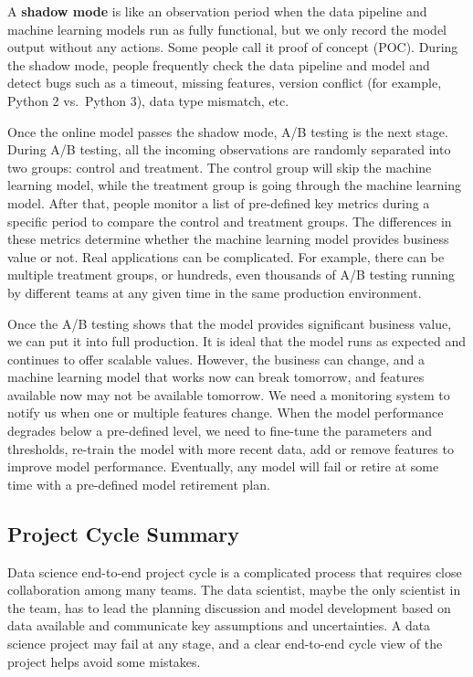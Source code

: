 \documentclass[
  12pt,
]{krantz}
\begin{document}
A \textbf{shadow mode} is like an observation period when the data pipeline and machine learning models run as fully functional, but we only record the model output without any actions. Some people call it proof of concept (POC). During the shadow mode, people frequently check the data pipeline and model and detect bugs such as a timeout, missing features, version conflict (for example, Python 2 vs.~Python 3), data type mismatch, etc.

Once the online model passes the shadow mode, A/B testing is the next stage. During A/B testing, all the incoming observations are randomly separated into two groups: control and treatment. The control group will skip the machine learning model, while the treatment group is going through the machine learning model. After that, people monitor a list of pre-defined key metrics during a specific period to compare the control and treatment groups. The differences in these metrics determine whether the machine learning model provides business value or not. Real applications can be complicated. For example, there can be multiple treatment groups, or hundreds, even thousands of A/B testing running by different teams at any given time in the same production environment.

Once the A/B testing shows that the model provides significant business value, we can put it into full production. It is ideal that the model runs as expected and continues to offer scalable values. However, the business can change, and a machine learning model that works now can break tomorrow, and features available now may not be available tomorrow. We need a monitoring system to notify us when one or multiple features change. When the model performance degrades below a pre-defined level, we need to fine-tune the parameters and thresholds, re-train the model with more recent data, add or remove features to improve model performance. Eventually, any model will fail or retire at some time with a pre-defined model retirement plan.

\hypertarget{ProjectCycleSummary}{%
\subsection{Project Cycle Summary}\label{ProjectCycleSummary}}

Data science end-to-end project cycle is a complicated process that requires close collaboration among many teams. The data scientist, maybe the only scientist in the team, has to lead the planning discussion and model development based on data available and communicate key assumptions and uncertainties. A data science project may fail at any stage, and a clear end-to-end cycle view of the project helps avoid some mistakes.
\end{document}

